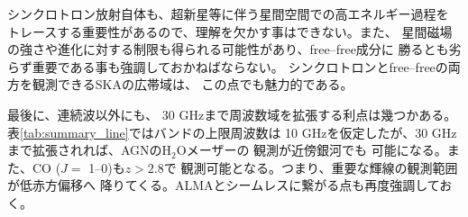 シンクロトロン放射自体も、超新星等に伴う星間空間での高エネルギー過程を
トレースする重要性があるので、理解を欠かす事はできない。また、
星間磁場の強さや進化に対する制限も得られる可能性があり、free--free成分に
勝るとも劣らず重要である事も強調しておかねばならない。
シンクロトロンとfree--freeの両方を観測できるSKAの広帯域は、
この点でも魅力的である。

最後に、連続波以外にも、
30 GHzまで周波数域を拡張する利点は幾つかある。
表\ref{tab:summary_line}ではバンドの上限周波数は
10 GHzを仮定したが、30 GHzまで拡張されれば、AGNのH$_2$Oメーザーの
観測が近傍銀河でも
可能になる。また、CO ($J=$ 1--0)も$z>2.8$で
観測可能となる。つまり、重要な輝線の観測範囲が低赤方偏移へ
降りてくる。ALMAとシームレスに繋がる点も再度強調しておく。

